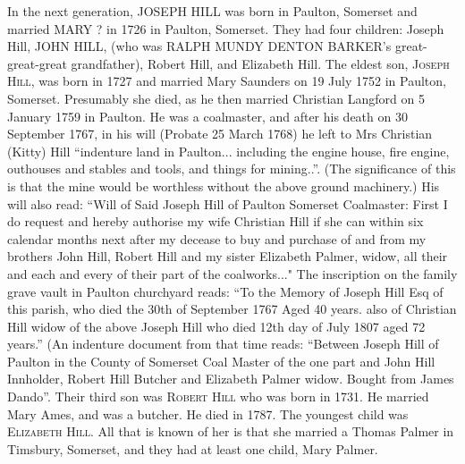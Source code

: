 In the next generation, \uppercase{Joseph Hill} was born in Paulton, Somerset and married \uppercase{Mary ?} in 1726 in Paulton, Somerset. They had four children: Joseph Hill, \uppercase{John Hill}, (who was \uppercase{Ralph Mundy Denton Barker}'s great-great-great grandfather), Robert Hill, and Elizabeth Hill.
The eldest son, \textsc{Joseph Hill}, was born in 1727 and married Mary Saunders on 19 July 1752 in Paulton, Somerset.  Presumably she died, as he then married Christian Langford on 5 January 1759 in Paulton. He was a coalmaster, and after his death on 30 September 1767, in his will (Probate 25 March 1768) he left to Mrs Christian (Kitty) Hill ``indenture land in Paulton... including the engine house, fire engine, outhouses and stables and tools, and things for mining..''.  (The significance of this is that the mine would be worthless without the above ground machinery.) His will also read: ``Will of Said Joseph Hill of Paulton Somerset Coalmaster:  First I do request and hereby authorise my wife Christian Hill if she can within six calendar months next after my decease to buy and purchase of and from my brothers John Hill, Robert Hill and my sister Elizabeth Palmer, widow, all their and each and every of their part of the coalworks..."  The inscription on the family grave vault in Paulton churchyard reads:
``To the Memory of Joseph Hill Esq of this parish, who died the 30th of September 1767 Aged 40 years.
  also of Christian Hill widow of the above Joseph Hill who died 12th day of July 1807 aged 72 years.''
(An indenture document from that time reads: ``Between Joseph Hill of Paulton in the County of Somerset Coal Master of the one part and John Hill Innholder, Robert Hill Butcher and Elizabeth Palmer widow. Bought from James Dando''.
Their third son was \textsc{Robert Hill} who was born in 1731. He married Mary Ames, and was a butcher. He died in 1787. 	
The youngest child was \textsc{Elizabeth Hill}. All that is known of her is that she married a Thomas Palmer in Timsbury, Somerset, and they had at least one child, Mary Palmer.

